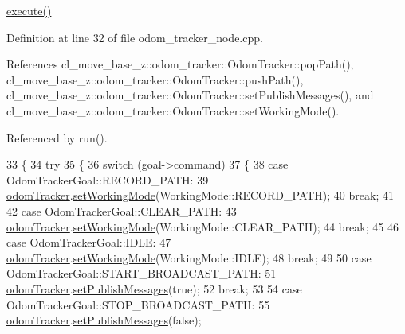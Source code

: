 \hyperlink{classOdomTrackerActionServer_afa69287377bb2a12c5346cbe8d68cb04}{execute()} 

Definition at line 32 of file odom\+\_\+tracker\+\_\+node.\+cpp.



References cl\+\_\+move\+\_\+base\+\_\+z\+::odom\+\_\+tracker\+::\+Odom\+Tracker\+::pop\+Path(), cl\+\_\+move\+\_\+base\+\_\+z\+::odom\+\_\+tracker\+::\+Odom\+Tracker\+::push\+Path(), cl\+\_\+move\+\_\+base\+\_\+z\+::odom\+\_\+tracker\+::\+Odom\+Tracker\+::set\+Publish\+Messages(), and cl\+\_\+move\+\_\+base\+\_\+z\+::odom\+\_\+tracker\+::\+Odom\+Tracker\+::set\+Working\+Mode().



Referenced by run().


\begin{DoxyCode}
33   \{
34     \textcolor{keywordflow}{try}
35     \{
36       \textcolor{keywordflow}{switch} (goal->command)
37       \{
38       \textcolor{keywordflow}{case} OdomTrackerGoal::RECORD\_PATH:
39         \hyperlink{classOdomTrackerActionServer_a3e5c4328d3206fbd2fd2708f0aefe651}{odomTracker}.\hyperlink{classcl__move__base__z_1_1odom__tracker_1_1OdomTracker_aeed01bdefd9a1cc709b0b3e4eed285ed}{setWorkingMode}(WorkingMode::RECORD\_PATH);
40         \textcolor{keywordflow}{break};
41 
42       \textcolor{keywordflow}{case} OdomTrackerGoal::CLEAR\_PATH:
43         \hyperlink{classOdomTrackerActionServer_a3e5c4328d3206fbd2fd2708f0aefe651}{odomTracker}.\hyperlink{classcl__move__base__z_1_1odom__tracker_1_1OdomTracker_aeed01bdefd9a1cc709b0b3e4eed285ed}{setWorkingMode}(WorkingMode::CLEAR\_PATH);
44         \textcolor{keywordflow}{break};
45 
46       \textcolor{keywordflow}{case} OdomTrackerGoal::IDLE:
47         \hyperlink{classOdomTrackerActionServer_a3e5c4328d3206fbd2fd2708f0aefe651}{odomTracker}.\hyperlink{classcl__move__base__z_1_1odom__tracker_1_1OdomTracker_aeed01bdefd9a1cc709b0b3e4eed285ed}{setWorkingMode}(WorkingMode::IDLE);
48         \textcolor{keywordflow}{break};
49 
50       \textcolor{keywordflow}{case} OdomTrackerGoal::START\_BROADCAST\_PATH:
51         \hyperlink{classOdomTrackerActionServer_a3e5c4328d3206fbd2fd2708f0aefe651}{odomTracker}.\hyperlink{classcl__move__base__z_1_1odom__tracker_1_1OdomTracker_a3b3cf9010e4e4fe4f96cfafd5a529517}{setPublishMessages}(\textcolor{keyword}{true});
52         \textcolor{keywordflow}{break};
53 
54       \textcolor{keywordflow}{case} OdomTrackerGoal::STOP\_BROADCAST\_PATH:
55         \hyperlink{classOdomTrackerActionServer_a3e5c4328d3206fbd2fd2708f0aefe651}{odomTracker}.\hyperlink{classcl__move__base__z_1_1odom__tracker_1_1OdomTracker_a3b3cf9010e4e4fe4f96cfafd5a529517}{setPublishMessages}(\textcolor{keyword}{false});

\end{DoxyCode}
